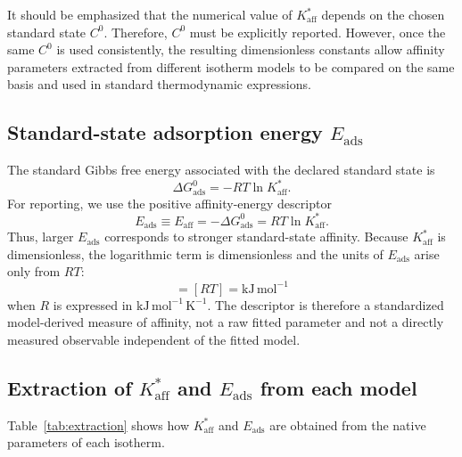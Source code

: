 \documentclass[journal=jacsat,manuscript=article]{achemso}
\begin{document}
It should be emphasized that the numerical value of $K_{\mathrm{aff}}^{\ast}$ depends on the chosen standard state $C^{0}$. Therefore, $C^{0}$ must be explicitly reported. However, once the same $C^{0}$ is used consistently, the resulting dimensionless constants allow affinity parameters extracted from different isotherm models to be compared on the same basis and used in standard thermodynamic expressions.
	
\subsection{Standard-state adsorption energy $E_{\mathrm{ads}}$}
\label{sec:Eads}

The standard Gibbs free energy associated with the declared standard state is
\begin{equation}
    \Delta G^0_{\mathrm{ads}}
    = -RT\ln K_{\mathrm{aff}}^{\ast}.
    \label{eq:DeltaGads}
\end{equation}
For reporting, we use the positive affinity-energy descriptor
\begin{equation}
    E_{\mathrm{ads}}
    \equiv E_{\mathrm{aff}}
    = -\Delta G^0_{\mathrm{ads}}
    = RT\ln K_{\mathrm{aff}}^{\ast}.
    \label{eq:Eads}
\end{equation}
Thus, larger \(E_{\mathrm{ads}}\) corresponds to stronger standard-state affinity. Because \(K_{\mathrm{aff}}^{\ast}\) is dimensionless, the logarithmic term is dimensionless and the units of \(E_{\mathrm{ads}}\) arise only from \(RT\):
\begin{equation}
    [E_{\mathrm{ads}}] = [RT] = \mathrm{kJ\,mol^{-1}}
\end{equation}
when \(R\) is expressed in \(\mathrm{kJ\,mol^{-1}\,K^{-1}}\). The descriptor is therefore a standardized model-derived measure of affinity, not a raw fitted parameter and not a directly measured observable independent of the fitted model.

	\subsection{Extraction of $K_{\mathrm{aff}}^{\ast}$ and $E_{\mathrm{ads}}$ from each model}
	\label{sec:extraction}

	Table~\ref{tab:extraction} shows how $K_{\mathrm{aff}}^{\ast}$ and $E_{\mathrm{ads}}$ are obtained from the native parameters of each isotherm.
\end{document}
